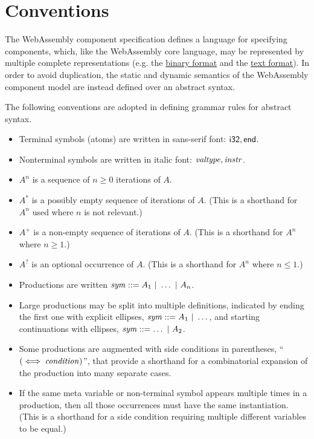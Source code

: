 \section{Conventions}

The WebAssembly component specification defines a language for
specifying components, which, like the WebAssembly core language, may
be represented by multiple complete representations (e.g. the
\hyperref[sec:binary-format]{binary format} and the
\hyperref[sec:text-format]{text format}). In order to avoid
duplication, the static and dynamic semantics of the WebAssembly
component model are instead defined over an abstract syntax.

The following conventions are adopted in defining grammar rules for abstract syntax.

\begin{itemize}
\item Terminal symbols (atoms) are written in sans-serif font:
  $\mathsf{i32}, \mathsf{end}$.

\item Nonterminal symbols are written in italic font:
  $\mathit{valtype}, \mathit{instr}$.

\item $A^n$ is a sequence of $n\geq 0$ iterations of $A$.

\item $A^\ast$ is a possibly empty sequence of iterations of $A$.
  (This is a shorthand for $A^n$ used where $n$ is not relevant.)

\item $A^+$ is a non-empty sequence of iterations of $A$. (This is a
  shorthand for $A^n$ where $n \geq 1$.)

\item $A^?$ is an optional occurrence of $A$. (This is a shorthand for
  $A^n$ where $n \leq 1$.)

\item Productions are written $\mathit{sym} ::= A_1 ~|~ \dots ~|~ A_n$.

\item Large productions may be split into multiple definitions,
  indicated by ending the first one with explicit ellipses,
  $\mathit{sym} ::= A_1 ~|~ \dots$, and starting continuations with
  ellipses, $\mathit{sym} ::= \dots ~|~ A_2$.

\item Some productions are augmented with side conditions in
  parentheses, ``$(\iff \mathit{condition})$'', that provide a shorthand for
  a combinatorial expansion of the production into many separate
  cases.

\item If the same meta variable or non-terminal symbol appears
  multiple times in a production, then all those occurrences must
  have the same instantiation. (This is a shorthand for a side
  condition requiring multiple different variables to be equal.)
\end{itemize}
